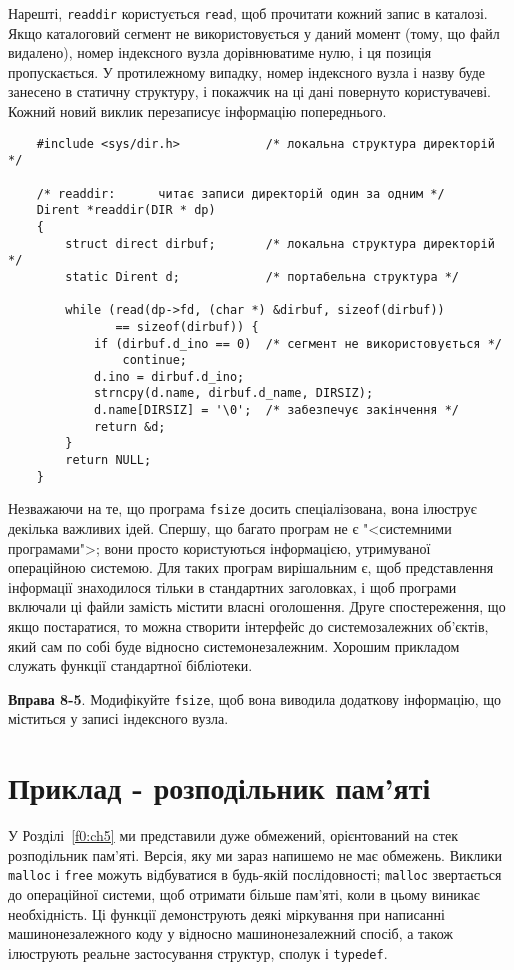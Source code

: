 \documentclass[a4paper,12pt]{book}
\begin{document}
  Нарешті, \texttt{readdir} користується \texttt{read}, щоб прочитати кожний запис в
  каталозі. Якщо каталоговий сегмент не використовується у даний момент (тому, що файл
  видалено), номер індексного вузла дорівнюватиме нулю, і ця позиція пропускається. У
  протилежному випадку, номер індексного вузла і назву буде занесено в статичну структуру,
  і покажчик на ці дані повернуто користувачеві. Кожний новий виклик перезаписує
  інформацію попереднього.

  \begin{verbatim}
    #include <sys/dir.h>            /* локальна структура директорій */

    /* readdir:      читає записи директорій один за одним */
    Dirent *readdir(DIR * dp)
    {
        struct direct dirbuf;       /* локальна структура директорій */
        static Dirent d;            /* портабельна структура */

        while (read(dp->fd, (char *) &dirbuf, sizeof(dirbuf))
               == sizeof(dirbuf)) {
            if (dirbuf.d_ino == 0)  /* сегмент не використовується */
                continue;
            d.ino = dirbuf.d_ino;
            strncpy(d.name, dirbuf.d_name, DIRSIZ);
            d.name[DIRSIZ] = '\0';  /* забезпечує закінчення */
            return &d;
        }
        return NULL;
    }
  \end{verbatim}

  Незважаючи на те, що програма \texttt{fsize} досить спеціалізована, вона ілюструє
  декілька важливих ідей. Спершу, що багато програм не є "<системними
  програмами">; вони просто користуються інформацією, утримуваної операційною
  системою. Для таких програм вирішальним є, щоб представлення інформації знаходилося
  тільки в стандартних заголовках, і щоб програми включали ці файли замість містити власні
  оголошення. Друге спостереження, що якщо постаратися, то можна створити інтерфейс до
  системозалежних об'єктів, який сам по собі буде відносно системонезалежним. Хорошим
  прикладом служать функції стандартної бібліотеки.

  \textbf{Вправа 8-5}. Модифікуйте \texttt{fsize}, щоб вона виводила додаткову інформацію,
  що міститься у записі індексного вузла.

\section{Приклад - розподільник пам'яті}
\label{f0:ch8.7}

  У Розділі~\ref{f0:ch5} ми представили дуже обмежений, орієнтований на стек
  розподільник пам'яті. Версія, яку ми зараз напишемо не має обмежень. Виклики
  \texttt{malloc} і \texttt{free} можуть відбуватися в будь-якій послідовності;
  \texttt{malloc} звертається до операційної системи, щоб отримати більше пам'яті, коли в
  цьому виникає необхідність. Ці функції демонструють деякі міркування при написанні
  машинонезалежного коду у відносно машинонезалежний спосіб, а також ілюструють реальне
  застосування структур, сполук і \texttt{typedef}.
\end{document}
